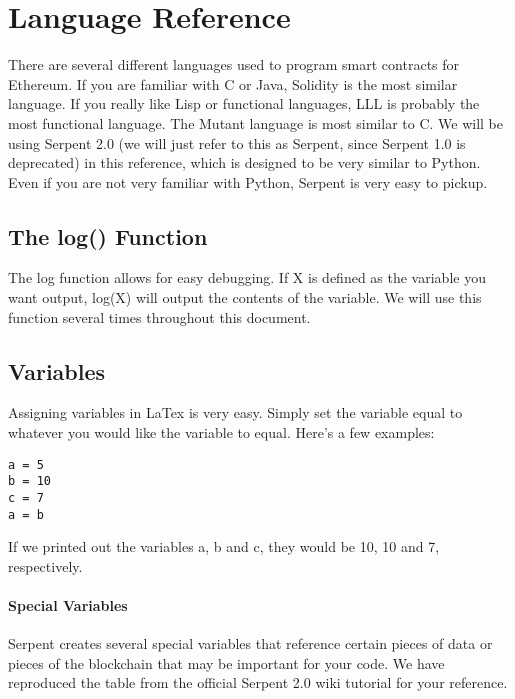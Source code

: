 \documentclass[12pt]{article}
\begin{document}
\section{Language Reference}

There are several different languages used to program smart contracts for Ethereum. If you are familiar with C or Java, Solidity is the most similar language. If you really like Lisp or functional languages, LLL is probably the most functional language. The Mutant language is most similar to C. We will be using Serpent 2.0 (we will just refer to this as Serpent, since Serpent 1.0 is deprecated) in this reference, which is designed to be very similar to Python. Even if you are not very familiar with Python, Serpent is very easy to pickup. 

\subsection{The log() Function}

The log function allows for easy debugging. If X is defined as the variable you want output, log(X) will output the contents of the variable. We will use this function several times throughout this document.


\subsection{Variables}

Assigning variables in LaTex is very easy. Simply set the variable equal to whatever you would like the variable to equal. Here's a few examples:

\begin{lstlisting}
a = 5
b = 10
c = 7
a = b
\end{lstlisting}

If we printed out the variables a, b and c, they would be 10, 10 and 7, respectively. 

\paragraph{Special Variables}

Serpent creates several special variables that reference certain pieces of data or pieces of the blockchain that may be important for your code. We have reproduced the table from the official Serpent 2.0 wiki tutorial for your reference. \cite{Serpent}
\end{document}
